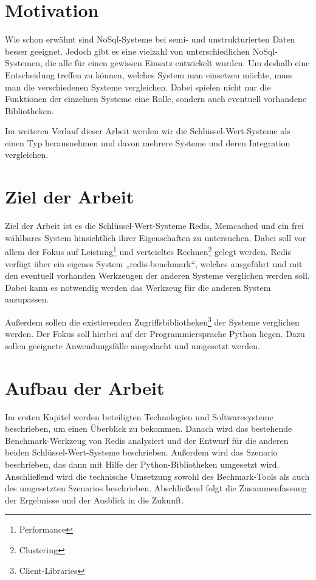 \section{Motivation}
Wie schon erwähnt sind NoSql-Systeme bei semi- und unstrukturierten Daten besser
geeignet. Jedoch gibt es eine vielzahl von unterschiedlichen NoSql-Systemen,
die alle für einen gewissen Einsatz entwickelt wurden. Um deshalb eine
Entscheidung treffen zu können, welches System man einsetzen möchte, muss man
die verschiedenen Systeme vergleichen. Dabei spielen nicht nur die Funktionen
der einzelnen Systeme eine Rolle, sondern auch eventuell vorhandene
Bibliotheken.

Im weiteren Verlauf dieser Arbeit werden wir die Schlüssel-Wert-Systeme als einen
Typ herausnehmen und davon mehrere Systeme und deren Integration vergleichen.

\section{Ziel der Arbeit}
Ziel der Arbeit ist es die Schlüssel-Wert-Systeme Redis, Memcached und ein frei
wählbares System hinsichtlich ihrer Eigenschaften zu untersuchen. Dabei soll
vor allem der Fokus auf Leistung\footnote{Performance} und verteieltes
Rechnen\footnote{Clustering} gelegt werden. Redis verfügt über ein
eigenes System „redis-benchmark“, welches ausgeführt und mit den eventuell
vorhanden Werkzeugen der anderen Systeme verglichen werden soll. Dabei kann es
notwendig werden das Werkzeug für die anderen System anzupassen.

Außerdem sollen die existierenden
Zugriffsbibliotheken\footnote{Client-Libraries} der Systeme verglichen
werden. Der Fokus soll hierbei auf der Programmiersprache Python liegen. Dazu
sollen geeignete Anwendungsfälle ausgedacht und umgesetzt werden.

\section{Aufbau der Arbeit}
Im ersten Kapitel werden beteiligten Technologien und Softwaresysteme
beschrieben, um einen Überblick zu bekommen. Danach wird das bestehende
Benchmark-Werkzeug von Redis analysiert und der Entwurf für die anderen beiden
Schlüssel-Wert-Systeme beschrieben. Außerdem wird das Szenario beschrieben, das
dann mit Hilfe der Python-Bibliotheken umgesetzt wird. Anschließend wird die
technische Umsetzung sowohl des Bechmark-Tools als auch des umgesetzten
Szenarios beschrieben. Abschließend folgt die Zusammenfassung der Ergebnisse
und der Ausblick in die Zukunft.
